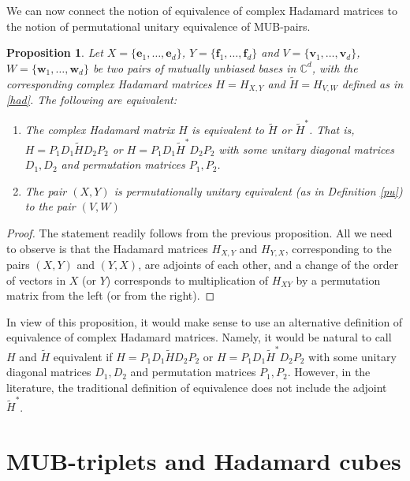\documentclass[12pt]{amsart}
\numberwithin{equation}{section}
\newtheorem{proposition}[fact]{Proposition}
\theoremstyle{definition}
\theoremstyle{remark}
\newenvironment{remark}
{\par\pushQED{\qed}\renewcommand\qedsymbol{$\diamond$}\nremark \small}
{\popQED\endnremark}
\theoremstyle{remark}
\newcommand{\CC}{\ensuremath{\mathbb{C}}}
\newcommand{\vb}{\ensuremath{\mathbf{v}}}
\newcommand{\eb}{\ensuremath{\mathbf{e}}}
\newcommand{\fb}{\ensuremath{\mathbf{f}}}
\newcommand{\wb}{\ensuremath{\mathbf{w}}}
\begin{document}
We can now connect the notion of equivalence of complex Hadamard matrices to the notion of permutational unitary equivalence of MUB-pairs. 

\begin{proposition}\label{pairpu}
Let $X=\{\eb_1,\ldots,\eb_d\}$, $Y=\{\fb_1,\ldots,\fb_d\}$ and $V=\{\vb_1,\ldots,\vb_d\}$, $W=\{\wb_1,\ldots,\wb_d\}$ be two pairs of mutually unbiased bases in $\CC^d$, with the corresponding  complex Hadamard matrices $H=H_{X,Y}$ and $\tilde{H}=H_{V,W}$ defined as in \eqref{had}.  
The following are equivalent: 
\begin{enumerate}
\item The complex Hadamard matrix $H$ is equivalent to $\tilde{H}$ or $\tilde{H}^\ast$. That is, $H=P_1 D_1 \tilde{H} D_2 P_2$ or $H=P_1 D_1 \tilde{H}^\ast D_2 P_2$  with some unitary diagonal matrices $D_1, D_2$
and permutation matrices $P_1, P_2$.


\item The pair $(X, Y)$ is permutationally unitary equivalent (as in Definition \ref{pu}) to the pair $(V, W)$
\end{enumerate}
\end{proposition}

\begin{proof}
The statement readily follows  from the previous proposition. All we need to observe is that the Hadamard matrices $H_{X,Y}$ and $H_{Y,X}$, corresponding to the pairs $(X,Y)$ and $(Y,X)$, are adjoints of each other, and a change of the order of vectors in $X$ (or $Y$) corresponds to multiplication of $H_{XY}$ by a permutation matrix from the left (or from the right).  
\end{proof}

\begin{remark}
In view of this proposition, it would make sense to use an alternative definition of equivalence of complex Hadamard matrices. Namely, it would be natural to call $H$ and $\tilde{H}$ equivalent if 
$H=P_1 D_1 \tilde{H} D_2 P_2$ or $H=P_1 D_1 \tilde{H}^\ast D_2 P_2$  with some unitary diagonal matrices $D_1, D_2$
and permutation matrices $P_1, P_2$. However, in the literature, the traditional definition of equivalence does not include the adjoint $\tilde{H}^\ast$.  
\end{remark}
    

\section{MUB-triplets and Hadamard cubes}\label{sec3}
\end{document}
